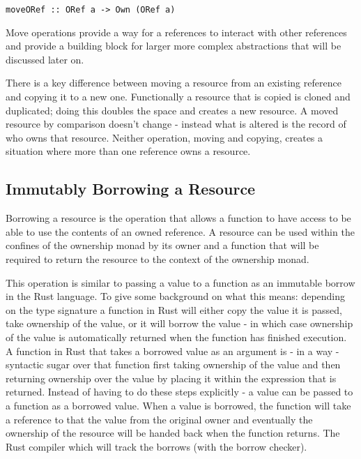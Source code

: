\documentclass[onehalf,11pt]{beavtex}
\begin{document}
\begin{verbatim}
moveORef :: ORef a -> Own (ORef a)
\end{verbatim}

Move operations provide a way for a references to interact with
other references and provide a building block for larger more complex
abstractions that will be discussed later on.

There is a key difference between moving a resource from an existing reference
and copying it to a new one.  Functionally a resource that is copied is cloned
and duplicated; doing this doubles the space and creates a new resource.
A moved resource by comparison doesn't change - instead what is altered is the
record of who owns that resource.  Neither operation, moving and copying,
creates a situation where more than one reference owns a resource.

\subsection{Immutably Borrowing a Resource}

Borrowing a resource is the operation that allows a function to have
access to be able to use the contents of an owned reference.
A resource can be used within the confines of the ownership monad by its owner
and a function that will be required to return the resource to the context of
the ownership monad.

This operation is similar to passing a value to a function as an immutable
borrow in the Rust language.  To give some background on what this means:
depending on the type signature a function in Rust will either copy the value
it is passed, take ownership of the value, or it will borrow the value - in
which case ownership of the value is automatically returned when the function
has finished execution.\cite{rust_book_ownership}
A function in Rust that takes a borrowed value as an argument is - in a way -
syntactic sugar over that function first taking ownership of the value and then
returning ownership over the value by placing it within the expression that is
returned.
Instead of having to do these steps explicitly - a value can be passed to a
function as a borrowed value.  When a value is borrowed, the function will take
a reference to that the value from the original owner and eventually the
ownership of the resource will be handed back when the function returns.
The Rust compiler which will track the borrows (with the borrow checker).
\end{document}
